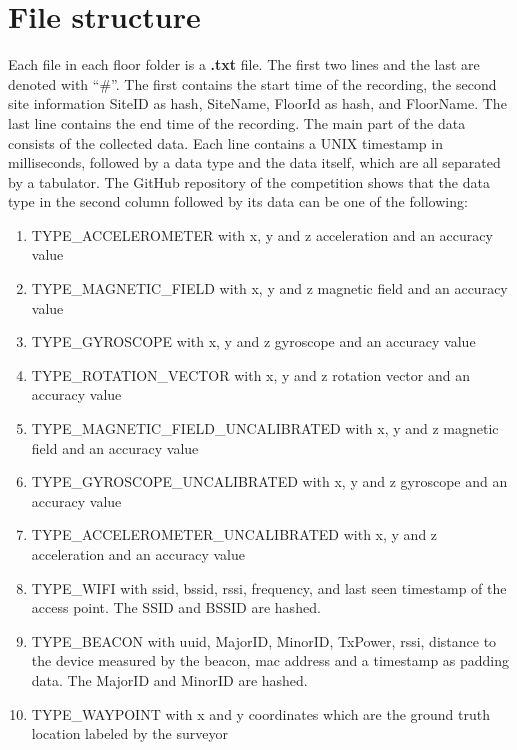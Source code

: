 \section{File structure}\label{sec:file-structure}

Each file in each floor folder is a \textbf{.txt} file. 
The first two lines and the last are denoted with ``\#''.
The first contains the start time of the recording, the second site information SiteID as hash, SiteName, FloorId as hash, and FloorName.
The last line contains the end time of the recording.
The main part of the data consists of the collected data. 
Each line contains a UNIX timestamp in milliseconds, followed by a data type and the data itself, which are all separated by a tabulator.
The GitHub repository of the competition\cite{GitHubComp} shows that the data type in the second column followed by its data can be one of the following:

\begin{enumerate}
    \item\label{type:acce} TYPE\_ACCELEROMETER with x, y and z acceleration and an accuracy value
    \item\label{type:mag} TYPE\_MAGNETIC\_FIELD with x, y and z magnetic field and an accuracy value
    \item\label{type:gyro} TYPE\_GYROSCOPE with x, y and z gyroscope and an accuracy value
    \item\label{type:rot} TYPE\_ROTATION\_VECTOR with x, y and z rotation vector and an accuracy value
    \item\label{type:mag_u} TYPE\_MAGNETIC\_FIELD\_UNCALIBRATED with x, y and z magnetic field and an accuracy value
    \item\label{type:gyro_u} TYPE\_GYROSCOPE\_UNCALIBRATED with x, y and z gyroscope and an accuracy value
    \item\label{type:acce_u} TYPE\_ACCELEROMETER\_UNCALIBRATED with x, y and z acceleration and an accuracy value
    \item\label{type:wifi} TYPE\_WIFI with \ac{ssid}, \ac{bssid}, \ac{rssi}, frequency, and last seen timestamp of the access point. The SSID and BSSID are hashed.
    \item\label{type:beacon} TYPE\_BEACON with \ac{uuid}, \ac{MajorID}, \ac{MinorID}, \ac{TxPower}, \ac{rssi}, distance to the device measured by the beacon, \ac{mac} address and a timestamp as padding data. The MajorID and MinorID are hashed.
    \item\label{type:way} TYPE\_WAYPOINT with x and y coordinates which are the ground truth location labeled by the surveyor
\end{enumerate}

